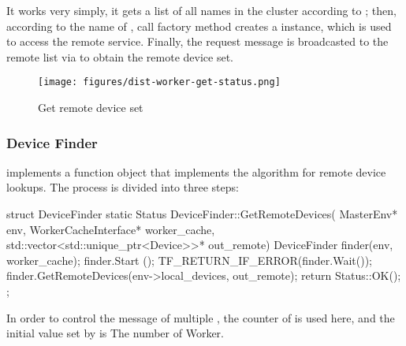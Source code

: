 \begin{content}
It works very simply, it gets a list of all  names in the cluster according to ; then, according to the name of , call  factory method creates a  instance, which is used to access the remote  service. Finally, the  request message is broadcasted to the remote  list via  to obtain the remote device set.

\begin{figure}[H]
  \centering
  \texttt{[image: figures/dist-worker-get-status.png]}
  \caption{Get remote device set}
  \label{fig:dist-worker-get-status}
\end{figure}


\subsubsection{Device Finder}
 implements a function object that implements the algorithm for remote device lookups. The process is divided into three steps:

\begin{enum}
\end{enum}

\begin{leftbar}
\begin{c++}
struct DeviceFinder {
  static Status DeviceFinder::GetRemoteDevices(
      MasterEnv* env,
      WorkerCacheInterface* worker_cache,
      std::vector<std::unique_ptr<Device>>* out_remote) {
    DeviceFinder finder(env, worker_cache);
    finder.Start ();
    TF_RETURN_IF_ERROR(finder.Wait());
    finder.GetRemoteDevices(env->local_devices, out_remote);
    return Status::OK();
  }
};
\end{c++}
\end{leftbar}

In order to control the  message of multiple , the counter of  is used here, and the initial value set by  is \code The number of {Worker}.


\end{content}
